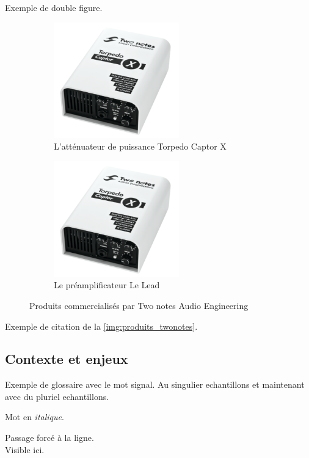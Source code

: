 \documentclass[a4paper]{article}
\begin{document}
Exemple de double figure.

\begin{figure}[H]
  \centering
  \begin{subfigure}{.49\textwidth}
    \centering
    \includegraphics[width=\linewidth, height=5cm, keepaspectratio]{../img/captorx}
     \caption{L'atténuateur de puissance Torpedo Captor X}
    \label{img:captorX}
  \end{subfigure}
  \begin{subfigure}{.49\textwidth}
    \centering
    \includegraphics[width=\linewidth, height=5cm, keepaspectratio]{../img/captorx}
     \caption{Le préamplificateur Le Lead}
    \label{img:leLead}
  \end{subfigure}
  \label{img:produits_twonotes}
  \caption{Produits commercialisés par Two notes Audio Engineering}
\end{figure}

Exemple de citation de la \autoref{img:produits_twonotes}.

\subsection{Contexte et enjeux}

Exemple de glossaire avec le mot \gls{signal}.
Au singulier \glspl{echantillon} et maintenant avec du pluriel \glspl{echantillon}.

Mot en \textit{italique}.

Passage forcé à la ligne.\\
Visible ici.
\end{document}
